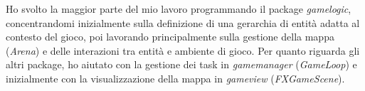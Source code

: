 Ho svolto la maggior parte del mio lavoro programmando il package \textit{gamelogic}, concentrandomi inizialmente sulla definizione di una gerarchia di entità adatta al contesto del gioco, poi lavorando principalmente sulla gestione della mappa (\textit{Arena}) e delle interazioni tra entità e ambiente di gioco. Per quanto riguarda gli altri package, ho aiutato con la gestione dei task in \textit{gamemanager} (\textit{GameLoop}) e inizialmente con la visualizzazione della mappa in \textit{gameview} (\textit{FXGameScene}).